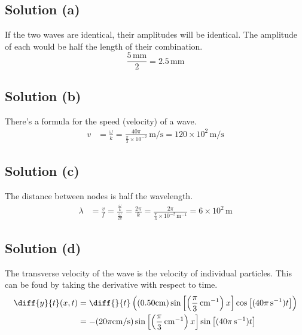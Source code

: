 \documentclass[12pt]{article}
\newcommand{\E}[1]{\times 10^{#1}}
\begin{document}
        \subsection{Solution (a)}
            If the two waves are identical, their amplitudes will be identical.
            The amplitude of each would be half the length of their combination.
            \begin{equation}
                \frac{5\,\unit{\milli\meter}}{2}    =   \boxed{2.5\,\unit{\milli\meter}}
            \end{equation}

        \subsection{Solution (b)}
            There's a formula for the speed (velocity) of a wave. 
            \begin{align}
                v   &=  \frac{\omega}{k}
                    =   \frac{40\pi}{\frac{\pi}{3}\E{-2}}\,\unit{\meter/\second}
                    =   120\E{2}\,\unit{\meter/\second}
            \end{align}
        
        \subsection{Solution (c)}
            The distance between nodes is half the wavelength.
            \begin{align}
                \lambda &=  \frac{v}{f}
                    =   \frac{\frac{\omega}{k}}{\frac{\omega}{2\pi}}
                    =   \frac{2\pi}{k}
                    =   \frac{2\pi}{\frac{\pi}{3}\E{-2}\,\unit{\meter^{-1}}}
                    =   \boxed{6\E{2}\,\unit{\meter}}
            \end{align}

        \subsection{Solution (d)}
            The transverse velocity of the wave is the velocity of individual particles.
            This can be foud by taking the derivative with respect to time.
            \begin{align}
                \diff{y}{t}(x,t) &=  \diff{}{t}\left( (0.50 \unit{\centi\meter}) \sin \left[  \left( \frac{\pi}{3}\,\unit{\centi\meter^{-1}} \right)x \right] \cos\left[ (40\pi\,\unit{\second^{-1}} )t \right] \right)\\
                    &=  -(20\pi \unit{\centi\meter/\second}) \sin \left[  \left( \frac{\pi}{3}\,\unit{\centi\meter^{-1}} \right)x \right] \sin\left[ (40\pi\,\unit{\second^{-1}} )t \right]
            \end{align}
\end{document}
